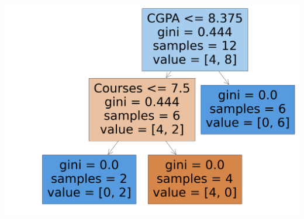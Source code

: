 \documentclass{article}
\begin{document}
	\includegraphics[scale=0.4]{images/3.png}\\\\
	\\\\
	
	
\end{document}
